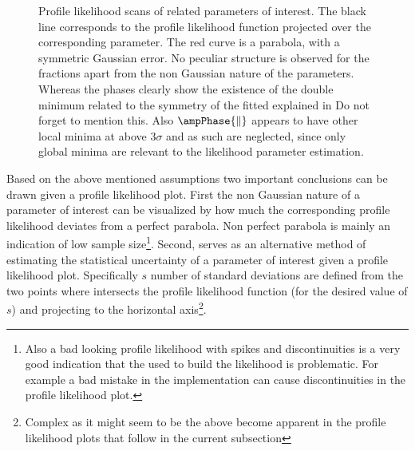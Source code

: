 \begin{figure}[h]
  \centering
  \begin{subfigure}{0.5\textwidth}
    \scalebox{0.60}{}
    \caption{}
    \label{nll_f0}
  \end{subfigure}%
  \hfill%
  \begin{subfigure}{0.5\textwidth}
    \scalebox{0.60}{}
    \caption{}
    \label{nll_fpar}
  \end{subfigure}
  \begin{subfigure}{0.5\textwidth}
    \scalebox{0.60}{}
    \caption{}
    \label{nll_AparPhase}
  \end{subfigure}%
  \hfill%
  \begin{subfigure}{0.5\textwidth}
    \scalebox{0.60}{}
    \caption{}
    \label{nll_AperpPhase}
  \end{subfigure}
\caption{Profile likelihood scans of \pwave related parameters of interest. The black line corresponds to the profile likelihood
         function projected over the corresponding parameter. The red curve is a parabola, with a symmetric Gaussian 
         error. No peculiar structure is observed for the \pwave fractions apart from the non Gaussian nature of the parameters.
         Whereas the phases clearly show the existence of the double minimum related to the symmetry of the fitted \pdf 
         explained in  {\color{red} Do not forget to mention this}.
         Also $\ampPhase{\parallel}$ appears to have other local minima at above $3\sigma$ and as such are neglected, since only
         global minima are relevant to the likelihood parameter estimation. }
\end{figure}

Based on the above mentioned assumptions two important conclusions can be drawn given a profile likelihood plot. First the non 
Gaussian nature of a parameter of interest can be visualized by how much the corresponding profile likelihood deviates from
a perfect parabola. Non perfect parabola is mainly an indication of low sample 
size\footnote{Also a bad looking profile likelihood with spikes and discontinuities is a very good indication that the \pdf
used to build the likelihood is problematic. For example a bad mistake in the implementation can cause discontinuities in the
profile likelihood plot.}. Second,  serves as an alternative method of estimating the statistical uncertainty
of a parameter of interest given a profile likelihood plot. Specifically $s$ number of standard deviations are defined from the two 
points where  intersects the profile likelihood function (for the desired value of $s$) and projecting to 
the horizontal 
axis\footnote{Complex as it might seem to be the above become apparent in the profile likelihood plots that follow in the current subsection}. 

